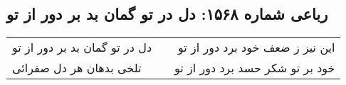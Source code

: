 \begin{center}
\section*{رباعی شماره ۱۵۶۸: دل در تو گمان بد بر دور از تو}
\label{sec:1568}
\begin{longtable}{l p{0.5cm} r}
دل در تو گمان بد بر دور از تو
&&
این نیز ز ضعف خود برد دور از تو
\\
تلخی بدهان هر دل صفرائی
&&
خود بر تو شکر حسد برد دور از تو
\\
\end{longtable}
\end{center}
